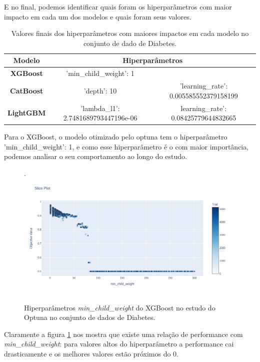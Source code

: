 E no final, podemos identificar quais foram os hiperparâmetros com maior impacto em cada um dos modelos e quais foram seus valores.
\begin{table}[H]
\centering
\begin{tabular}{|c|c|c|}
\hline
\textbf{Modelo} & \multicolumn{2}{c|}{\textbf{Hiperparâmetros}} \\
\hline
\textbf{XGBoost} & 'min\_child\_weight': 1 & \\
\hline
\textbf{CatBoost} &'depth': 10 & 'learning\_rate': 0.005585552379158199 \\
\hline
\textbf{LightGBM} &'lambda\_l1': 2.7481689793447196e-06 & learning\_rate': 0.08425779644832665 \\
\hline
\end{tabular}
\caption{Valores finais dos hiperparâmetros com maiores impactos em cada modelo no conjunto de dado de Diabetes.}
\end{table}

Para o XGBoost, o modelo otimizado pelo optuna tem o hiperparâmetro 'min\_child\_weight': 1, e como esse hiperparâmetro é o com maior importância, podemos analisar o seu comportamento ao longo do estudo. 
\begin{figure}[H]
 \caption{Hiperparâmetros \textit{min\_child\_weight} do XGBoost no estudo do Optuna no conjunto de dados de Diabetes.}.
 \label{fig:op:dia:min:xgb}
 \centering
 \includegraphics[scale=0.3]{images/optuna_xgboost_min_dia.png}
\end{figure}
Claramente a figura \ref{fig:op:dia:min:xgb} nos mostra que existe uma relação de performance com \textit{min\_child\_weight}: para valores altos do hiperparâmetro a performance cai drasticamente e os melhores valores estão próximos do 0.

